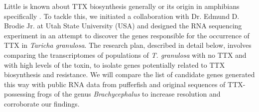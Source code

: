 Little is known about TTX biosynthesis generally or its origin in amphibians specifically \citep{jal2015overview}. To tackle this, we initiated a collaboration with Dr. Edmund D. Brodie Jr. at Utah State University (USA) and designed the RNA sequencing experiment in an attempt to discover the genes responsible for the occurrence of TTX in \textit{Taricha granulosa}. The research plan, described in detail below, involves comparing the transcriptomes of populations of \textit{T. granulosa} with no TTX and with high levels of the toxin, to isolate genes potentially related to TTX biosynthesis and resistance. We will compare the list of candidate genes generated this way with public RNA data from pufferfish and original sequences of TTX-possessing frogs of the genus \textit{Brachycephalus} to increase resolution and corroborate our findings.